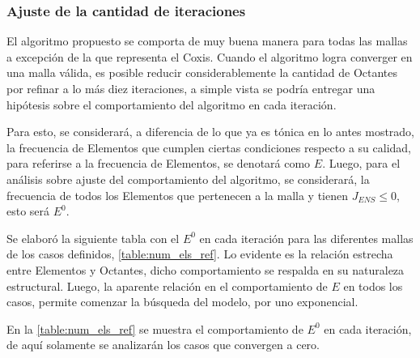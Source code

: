 \subsubsection{Ajuste de la cantidad de iteraciones}

El algoritmo propuesto se comporta de muy buena manera para todas las mallas a excepción de la que representa el Coxis.  Cuando el algoritmo logra converger en una malla válida, es posible reducir considerablemente la cantidad de Octantes por refinar a lo más diez iteraciones, a simple vista se podría entregar una hipótesis sobre el comportamiento del algoritmo en cada iteración.

Para esto, se considerará, a diferencia de lo que ya es tónica en lo antes mostrado, la frecuencia de Elementos que cumplen ciertas condiciones respecto a su calidad, para referirse a la frecuencia de Elementos, se denotará como $E$. Luego, para el análisis sobre ajuste del comportamiento del algoritmo, se considerará, la frecuencia de todos los Elementos que pertenecen a la malla y tienen $J_{ENS} \leq 0$, esto será $E^0$. 

Se elaboró la siguiente tabla con el $E^0$ en cada iteración para las diferentes mallas de los casos definidos, \autoref{table:num_els_ref}. Lo evidente es la relación estrecha entre Elementos y Octantes, dicho comportamiento se respalda en su naturaleza estructural. Luego, la aparente relación en el comportamiento de $E$ en todos los casos, permite comenzar la búsqueda del modelo, por uno exponencial.


En la \autoref{table:num_els_ref} se muestra el comportamiento de $E^0$ en cada iteración, de aquí solamente se analizarán los casos que convergen a cero.

